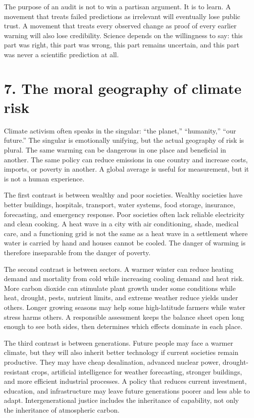 ﻿\documentclass[12pt,a4paper]{book}
\begin{document}
The purpose of an audit is not to win a partisan argument. It is to learn. A movement that treats failed predictions as irrelevant will eventually lose public trust. A movement that treats every observed change as proof of every earlier warning will also lose credibility. Science depends on the willingness to say: this part was right, this part was wrong, this part remains uncertain, and this part was never a scientific prediction at all.

\section{7. The moral geography of climate risk}
Climate activism often speaks in the singular: ``the planet,'' ``humanity,'' ``our future.'' The singular is emotionally unifying, but the actual geography of risk is plural. The same warming can be dangerous in one place and beneficial in another. The same policy can reduce emissions in one country and increase costs, imports, or poverty in another. A global average is useful for measurement, but it is not a human experience.

The first contrast is between wealthy and poor societies. Wealthy societies have better buildings, hospitals, transport, water systems, food storage, insurance, forecasting, and emergency response. Poor societies often lack reliable electricity and clean cooking. A heat wave in a city with air conditioning, shade, medical care, and a functioning grid is not the same as a heat wave in a settlement where water is carried by hand and houses cannot be cooled. The danger of warming is therefore inseparable from the danger of poverty.

The second contrast is between sectors. A warmer winter can reduce heating demand and mortality from cold while increasing cooling demand and heat risk. More carbon dioxide can stimulate plant growth under some conditions while heat, drought, pests, nutrient limits, and extreme weather reduce yields under others. Longer growing seasons may help some high-latitude farmers while water stress harms others. A responsible assessment keeps the balance sheet open long enough to see both sides, then determines which effects dominate in each place.

The third contrast is between generations. Future people may face a warmer climate, but they will also inherit better technology if current societies remain productive. They may have cheap desalination, advanced nuclear power, drought-resistant crops, artificial intelligence for weather forecasting, stronger buildings, and more efficient industrial processes. A policy that reduces current investment, education, and infrastructure may leave future generations poorer and less able to adapt. Intergenerational justice includes the inheritance of capability, not only the inheritance of atmospheric carbon.
\end{document}
